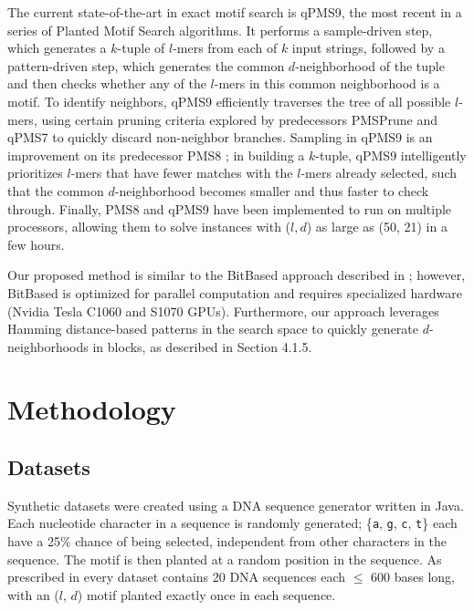 \documentclass{acm_proc_article-sp}
\begin{document}
	The current state-of-the-art in exact motif search is qPMS9, the most recent in a series \cite{pms2007,pms2014,pms2015} of Planted Motif Search algorithms. It performs a sample-driven step, which generates a $k$-tuple of $l$-mers from each of $k$ input strings, followed by a pattern-driven step, which generates the common $d$-neighborhood of the tuple and then checks whether any of the $l$-mers in this common neighborhood is a motif. To identify neighbors, qPMS9 efficiently traverses the tree of all possible $l$-mers, using certain pruning criteria explored by predecessors PMSPrune and qPMS7 \cite{pms2007} to quickly discard non-neighbor branches. Sampling in qPMS9 is an improvement on its predecessor PMS8 \cite{pms2014}; in building a $k$-tuple, qPMS9 intelligently prioritizes $l$-mers that have fewer matches with the $l$-mers already selected, such that the common $d$-neighborhood becomes smaller and thus faster to check through.  Finally, PMS8 and qPMS9 have been implemented to run on multiple processors, allowing them to solve instances with ($l, d$) as large as (50, 21) in a few hours.

	Our proposed method %
	is similar to the BitBased approach described in \cite{dasari2010efficient}; however, BitBased is optimized for parallel computation and requires specialized hardware (Nvidia Tesla C1060 and S1070 GPUs). Furthermore, our approach leverages Hamming distance-based patterns in the search space to quickly generate $d$-neighborhoods in blocks, as described in Section 4.1.5.

\section{Methodology}
	\subsection{Datasets}
		Synthetic datasets were created using a DNA sequence generator written in Java. Each nucleotide character in a sequence is randomly generated; \{\texttt{a}, \texttt{g}, \texttt{c}, \texttt{t}\} each have a 25\% chance of being selected, independent from other characters in the sequence. The motif is then planted at a random position in the sequence. As prescribed in \cite{pevzner2000combinatorial} every dataset contains 20 DNA sequences each $\leq$ 600 bases long, with an ($l$, $d$) motif planted exactly once in each sequence.
\end{document}
